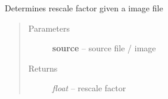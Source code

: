 \documentclass[letterpaper,10pt,english]{sphinxmanual}
\begin{document}

\begin{fulllineitems}
\label{api/ClearMap.ImageProcessing:ClearMap.ImageProcessing.IlastikClassification.rescaleFactorIlastik}
Determines rescale factor given a image file
\begin{quote}\begin{description}
\item[{Parameters}] \leavevmode
\textbf{source} --
source file / image

\item[{Returns}] \leavevmode
\emph{float} --
rescale factor

\end{description}\end{quote}

\end{fulllineitems}

\end{document}
